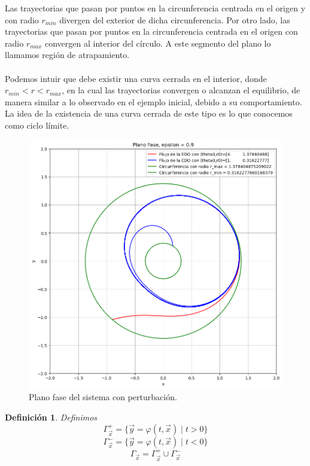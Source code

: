 \documentclass[12pt, a4paper]{report}
\newtheorem{definition}{Definición}
\begin{document}
Las trayectorias que pasan por puntos en la circunferencia centrada
en el origen y con radio $r_{min}$
divergen del exterior de dicha circunferencia. Por otro lado,
las trayectorias que pasan por puntos en la circunferencia centrada
en el origen con radio $r_{max}$
convergen al interior del círculo.
A este segmento del plano lo llamamos región de atrapamiento.\\
\\Podemos intuir que debe existir
una curva cerrada en el interior, donde $r_{min}<r<r_{max}$, en la cual
las trayectorias convergen o alcanzan el equilibrio, de manera similar
a lo observado en el ejemplo
inicial, debido a su comportamiento. La idea de la existencia de una
curva cerrada de este tipo es lo que conocemos como ciclo límite.
\begin{figure}[h]
	\centering
	\includegraphics[width=13cm]{rminrmax.png}
	\caption{Plano fase del sistema con perturbación.}
\end{figure}

\newpage

\begin{definition}
	Definimos
	$$\varGamma_{\vec{x}}^{+}=\{\vec{y}=\varphi(t,\vec{x})\mid t>0\}$$
	$$\varGamma_{\vec{x}}^{-}=\{\vec{y}=\varphi(t,\vec{x})\mid t<0\}$$
	$$\varGamma_{\vec{x}}=\varGamma_{\vec{x}}^{+}\cup\varGamma_{\vec{x}}^{-}$$
\end{definition}
\end{document}
